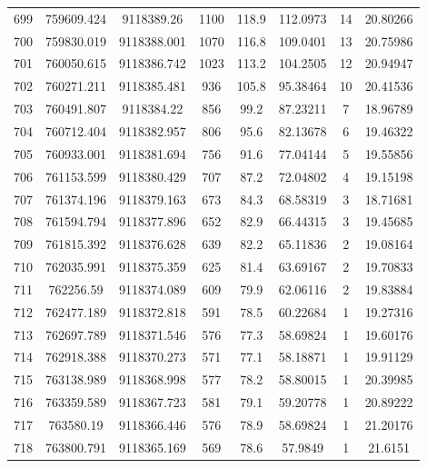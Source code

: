 \begin{longtable}{cccccccc}
699  & 759609.424      & 9118389.26       & 1100    & 118.9 & 112.0973 & 14 & 20.80266 \\
700  & 759830.019      & 9118388.001      & 1070    & 116.8 & 109.0401 & 13 & 20.75986 \\
701  & 760050.615      & 9118386.742      & 1023    & 113.2 & 104.2505 & 12 & 20.94947 \\
702  & 760271.211      & 9118385.481      & 936     & 105.8 & 95.38464 & 10 & 20.41536 \\
703  & 760491.807      & 9118384.22       & 856     & 99.2  & 87.23211 & 7  & 18.96789 \\
704  & 760712.404      & 9118382.957      & 806     & 95.6  & 82.13678 & 6  & 19.46322 \\
705  & 760933.001      & 9118381.694      & 756     & 91.6  & 77.04144 & 5  & 19.55856 \\
706  & 761153.599      & 9118380.429      & 707     & 87.2  & 72.04802 & 4  & 19.15198 \\
707  & 761374.196      & 9118379.163      & 673     & 84.3  & 68.58319 & 3  & 18.71681 \\
708  & 761594.794      & 9118377.896      & 652     & 82.9  & 66.44315 & 3  & 19.45685 \\
709  & 761815.392      & 9118376.628      & 639     & 82.2  & 65.11836 & 2  & 19.08164 \\
710  & 762035.991      & 9118375.359      & 625     & 81.4  & 63.69167 & 2  & 19.70833 \\
711  & 762256.59       & 9118374.089      & 609     & 79.9  & 62.06116 & 2  & 19.83884 \\
712  & 762477.189      & 9118372.818      & 591     & 78.5  & 60.22684 & 1  & 19.27316 \\
713  & 762697.789      & 9118371.546      & 576     & 77.3  & 58.69824 & 1  & 19.60176 \\
714  & 762918.388      & 9118370.273      & 571     & 77.1  & 58.18871 & 1  & 19.91129 \\
715  & 763138.989      & 9118368.998      & 577     & 78.2  & 58.80015 & 1  & 20.39985 \\
716  & 763359.589      & 9118367.723      & 581     & 79.1  & 59.20778 & 1  & 20.89222 \\
717  & 763580.19       & 9118366.446      & 576     & 78.9  & 58.69824 & 1  & 21.20176 \\
718  & 763800.791      & 9118365.169      & 569     & 78.6  & 57.9849  & 1  & 21.6151  \\

\end{longtable}

